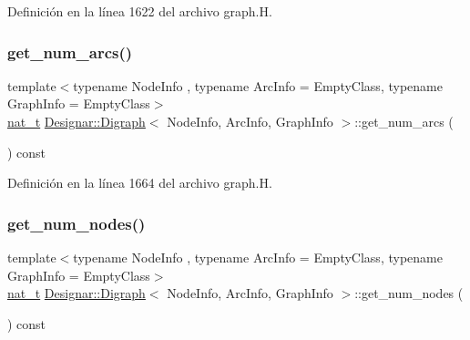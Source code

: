 Definición en la línea 1622 del archivo graph.\+H.

\mbox{\label{class_designar_1_1_digraph_aa6289acc079b48c3ebaead44a974d716}} 
\subsubsection{\texorpdfstring{get\+\_\+num\+\_\+arcs()}{get\_num\_arcs()}}
{\footnotesize\ttfamily template$<$typename Node\+Info , typename Arc\+Info  = Empty\+Class, typename Graph\+Info  = Empty\+Class$>$ \\
\hyperlink{namespace_designar_aa72662848b9f4815e7bf31a7cf3e33d1}{nat\+\_\+t} \hyperlink{class_designar_1_1_digraph}{Designar\+::\+Digraph}$<$ Node\+Info, Arc\+Info, Graph\+Info $>$\+::get\+\_\+num\+\_\+arcs (\begin{DoxyParamCaption}{ }\end{DoxyParamCaption}) const\hspace{0.3cm}{\ttfamily [inline]}}



Definición en la línea 1664 del archivo graph.\+H.

\mbox{\label{class_designar_1_1_digraph_a7e2f0b56ec85cfd63ff757bef58ae702}} 
\subsubsection{\texorpdfstring{get\+\_\+num\+\_\+nodes()}{get\_num\_nodes()}}
{\footnotesize\ttfamily template$<$typename Node\+Info , typename Arc\+Info  = Empty\+Class, typename Graph\+Info  = Empty\+Class$>$ \\
\hyperlink{namespace_designar_aa72662848b9f4815e7bf31a7cf3e33d1}{nat\+\_\+t} \hyperlink{class_designar_1_1_digraph}{Designar\+::\+Digraph}$<$ Node\+Info, Arc\+Info, Graph\+Info $>$\+::get\+\_\+num\+\_\+nodes (\begin{DoxyParamCaption}{ }\end{DoxyParamCaption}) const\hspace{0.3cm}{\ttfamily [inline]}}



